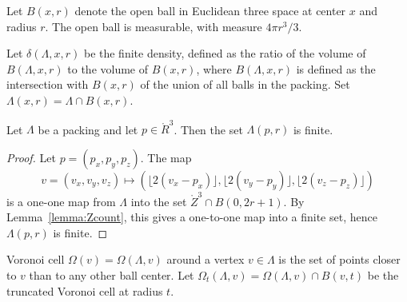 



  Let $B(x,r)$ denote the open ball in
Euclidean three space at center $x$ and radius $r$.  The open ball
is measurable, with measure $4\pi r^3/3$.



Let $\delta(\Lambda,x,r)$ be the finite density, defined as the
ratio of the volume of $B(\Lambda,x,r)$ to the volume of $B(x,r)$,
where $B(\Lambda,x,r)$ is defined as the intersection with
$B(x,r)$ of the union of all balls in the packing. Set
$\Lambda(x,r) = \Lambda \cap
B(x,r)$.

\begin{lemma}\label{lemma:Lambda-finite}
Let $\Lambda$ be a packing and let $p\in\ring{R}^3$.
Then the set $\Lambda(p,r)$ is finite.
\end{lemma}

\begin{proof}  Let $p = (p_x,p_y,p_z)$. The map
$$v=(v_x,v_y,v_z)\mapsto (\lfloor 2(v_x-p_x)
\rfloor, \lfloor 2(v_y-p_y) \rfloor, \lfloor 2(v_z-p_z) \rfloor)$$
is a one-one map from $\Lambda$ into the set $\ring{Z}^3\cap B(0,2
r
 + 1)$.  By Lemma~\ref{lemma:Zcount}, this gives a one-to-one map
 into a finite set, hence $\Lambda(p,r)$ is finite.
\end{proof}

\begin{definition}\label{def:voronoi} Voronoi cell
$\Omega(v)=\Omega(\Lambda,v)$ around a
vertex $v\in \Lambda$ is the set of points closer to $v$ than to
any other ball center.  Let $\Omega_t(\Lambda,v) = \Omega(\Lambda,v)
\cap B(v,t)$ be the truncated Voronoi cell at radius $t$.
\end{definition}


